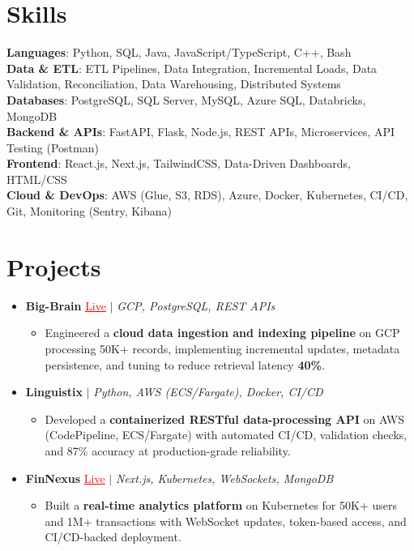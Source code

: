 \documentclass[letterpaper,10pt]{article}
\newcommand{\resumeItem}[1]{\item\small{{#1 \vspace{-2pt}}}}
\newcommand{\resumeProjectHeading}[1]{\item \small #1 \vspace{-2pt}}
\newcommand{\resumeSubHeadingListStart}{\begin{itemize}[leftmargin=0.0in, label={}]}
\newcommand{\resumeSubHeadingListEnd}{\end{itemize}}
\newcommand{\resumeProjItemListStart}{\begin{itemize}[leftmargin=0.15in,label=\textbullet,itemsep=0pt,topsep=0pt,parsep=0pt,partopsep=0pt]}
\newcommand{\resumeProjItemListEnd}{\end{itemize}\vspace{-4pt}}
\begin{document}
\section{Skills}
\begin{itemize}[leftmargin=0.15in, label={}]
\small{\item{
\textbf{Languages}: Python, SQL, Java, JavaScript/TypeScript, C++, Bash \\
\textbf{Data \& ETL}: ETL Pipelines, Data Integration, Incremental Loads, Data Validation, Reconciliation, Data Warehousing, Distributed Systems \\
\textbf{Databases}: PostgreSQL, SQL Server, MySQL, Azure SQL, Databricks, MongoDB \\
\textbf{Backend \& APIs}: FastAPI, Flask, Node.js, REST APIs, Microservices, API Testing (Postman) \\
\textbf{Frontend}: React.js, Next.js, TailwindCSS, Data-Driven Dashboards, HTML/CSS \\
\textbf{Cloud \& DevOps}: AWS (Glue, S3, RDS), Azure, Docker, Kubernetes, CI/CD, Git, Monitoring (Sentry, Kibana)
}}
\end{itemize}
\vspace{-6pt}
\section{Projects}
\resumeSubHeadingListStart
\vspace{-2pt}
\resumeProjectHeading{\textbf{Big-Brain} {\href{https://big-brain-pied.vercel.app/}{\textcolor{red}{\underline{Live}}}} $|$ \emph{GCP, PostgreSQL, REST APIs}}
\resumeProjItemListStart
\resumeItem{Engineered a \textbf{cloud data ingestion and indexing pipeline} on GCP processing 50K+ records, implementing incremental updates, metadata persistence, and tuning to reduce retrieval latency \textbf{40\%}.}
\resumeProjItemListEnd
\vspace{3pt}
\resumeProjectHeading{\textbf{Linguistix} $|$ \emph{Python, AWS (ECS/Fargate), Docker, CI/CD}}
\resumeProjItemListStart
\resumeItem{Developed a \textbf{containerized RESTful data-processing API} on AWS (CodePipeline, ECS/Fargate) with automated CI/CD, validation checks, and 87\% accuracy at production-grade reliability.}
\resumeProjItemListEnd
\vspace{3pt}
\resumeProjectHeading{\textbf{FinNexus} {\href{https://fin-nexus.vercel.app/}{\textcolor{red}{\underline{Live}}}} $|$ \emph{Next.js, Kubernetes, WebSockets, MongoDB}}
\resumeProjItemListStart
\resumeItem{Built a \textbf{real-time analytics platform} on Kubernetes for 50K+ users and 1M+ transactions with WebSocket updates, token-based access, and CI/CD-backed deployment.}
\resumeProjItemListEnd
\resumeSubHeadingListEnd
\end{document}
